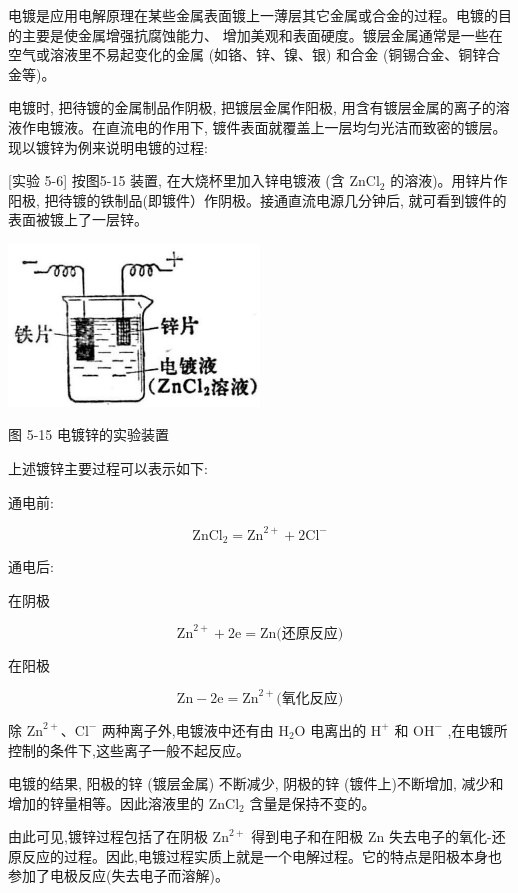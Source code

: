 \documentclass[10pt]{article}
\begin{document}
电镀是应用电解原理在某些金属表面镀上一薄层其它金属或合金的过程。电镀的目的主要是使金属增强抗腐蚀能力、 增加美观和表面硬度。镀层金属通常是一些在空气或溶液里不易起变化的金属 (如铬、锌、镍、银) 和合金 (铜锡合金、铜锌合金等)。

电镀时, 把待镀的金属制品作阴极, 把镀层金属作阳极, 用含有镀层金属的离子的溶液作电镀液。在直流电的作用下, 镀件表面就覆盖上一层均匀光洁而致密的镀层。现以镀锌为例来说明电镀的过程:

[实验 5-6] 按图5-15 装置, 在大烧杯里加入锌电镀液 (含 \({\mathrm{{ZnCl}}}_{2}\) 的溶液)。用锌片作阳极, 把待镀的铁制品(即镀件）作阴极。接通直流电源几分钟后, 就可看到镀件的表面被镀上了一层锌。

\begin{center}
\includegraphics[max width=0.5\textwidth]{images/01912d13-9986-7822-a012-3f3f7be99dcb_172_665360.jpg}
\end{center}

图 5-15 电镀锌的实验装置

上述镀锌主要过程可以表示如下:

通电前:

\[
{\mathrm{{ZnCl}}}_{2} = {\mathrm{{Zn}}}^{2 + } + 2{\mathrm{{Cl}}}^{ - }
\]

通电后:

在阴极

\[
{\mathrm{{Zn}}}^{2 + } + 2\mathrm{e} = \mathrm{{Zn}}\text{(还原反应)}
\]

在阳极

\[
\mathrm{{Zn}} - 2\mathrm{e} = {\mathrm{{Zn}}}^{2 + }\text{(氧化反应)}
\]

除 \({\mathrm{{Zn}}}^{2 + }\text{、}{\mathrm{{Cl}}}^{ - }\) 两种离子外,电镀液中还有由 \({\mathrm{H}}_{2}\mathrm{O}\) 电离出的 \({\mathrm{H}}^{ + }\) 和 \({\mathrm{{OH}}}^{ - }\) ,在电镀所控制的条件下,这些离子一般不起反应。

电镀的结果, 阳极的锌 (镀层金属) 不断减少, 阴极的锌 (镀件上)不断增加, 减少和增加的锌量相等。因此溶液里的 \({\mathrm{{ZnCl}}}_{2}\) 含量是保持不变的。

由此可见,镀锌过程包括了在阴极 \({\mathrm{{Zn}}}^{2 + }\) 得到电子和在阳极 \(\mathrm{{Zn}}\) 失去电子的氧化-还原反应的过程。因此,电镀过程实质上就是一个电解过程。它的特点是阳极本身也参加了电极反应(失去电子而溶解)。
\end{document}
